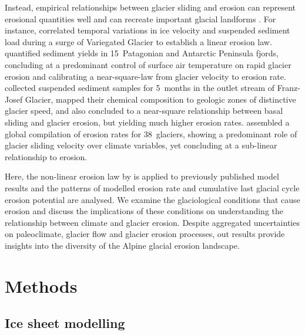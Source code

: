 \documentclass[esurf, manuscript]{copernicus}
\begin{document}
    Instead, empirical relationships between glacier sliding and erosion can
    represent erosional quantities well and can recreate important glacial
    landforms \citep[e.g.,][]{Harbor.etal.1988, Macgregor.etal.2000}.
    For instance, \citet{Humphrey.Raymond.1994} correlated temporal variations
    in ice velocity and suspended sediment load during a surge of Variegated
    Glacier to establish a linear erosion law.
    \citet{Koppes.etal.2015} quantified sediment
    yields in 15~Patagonian and Antarctic Peninsula fjords, concluding at a
    predominant control of surface air temperature on rapid glacier erosion and
    calibrating a near-square-law from glacier velocity to erosion rate.
    \citet{Herman.etal.2015} collected suspended sediment samples for 5~months
    in the outlet stream of Franz-Josef Glacier, mapped their chemical
    composition to geologic zones of distinctive glacier speed, and also
    concluded to a near-square relationship between basal sliding and glacier
    erosion, but yielding much higher erosion rates.
    \citet{Cook.etal.2020} assembled a global compilation of erosion rates for
    38~glaciers, showing a predominant role of glacier sliding velocity over
    climate variables, yet concluding at a sub-linear relationship to erosion.

    Here, the non-linear erosion law by \citet{Koppes.etal.2015} is applied to
    previously published model results \citep{Seguinot.etal.2018} and the
    patterns of modelled erosion rate and cumulative last glacial cycle erosion
    potential are analysed. We examine the glaciological conditions that cause
    erosion and discuss the implications of these conditions on understanding
    the relationship between climate and glacier erosion. Despite aggregated
    uncertainties on paleoclimate, glacier flow and glacier erosion processes,
    out results provide insights into the diversity of the Alpine glacial
    erosion landscape.


\section{Methods}

\subsection{Ice sheet modelling}
\end{document}
